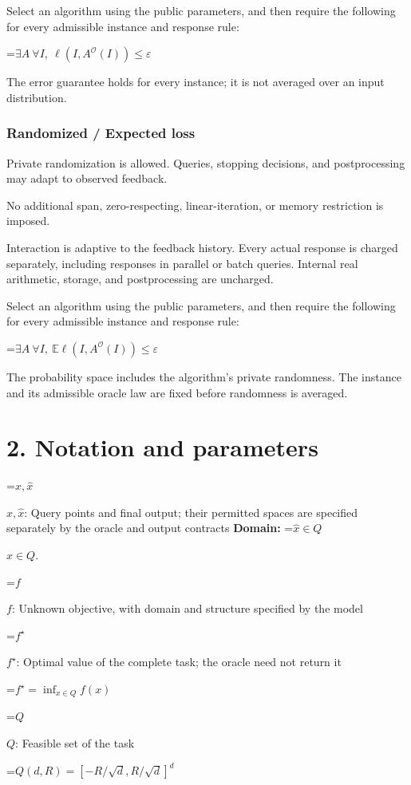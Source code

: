 \documentclass[10pt,a4paper]{article}
\newcommand{\AtlasMath}[1]{\par\begingroup\centering\setbox0=\hbox{$\displaystyle #1$}\ifdim\wd0>1.4\linewidth\typeout{ATLAS WIDE FORMULA: \the\wd0}\fi\ifdim\wd0>\linewidth\resizebox{\linewidth}{!}{\box0}\else\box0\fi\par\endgroup}
\newcommand{\AtlasInlineMath}[1]{\begingroup\setbox0=\hbox{$#1$}\ifdim\wd0>.4\linewidth\endgroup\AtlasMath{#1}\else\endgroup$#1$\fi}
\begin{document}
Select an algorithm using the public parameters, and then require the following for every admissible instance and response rule:


\AtlasMath{\exists A\ \forall I,\ \ell(I,A^\mathcal{O}(I))\le\varepsilon}


The error guarantee holds for every instance; it is not averaged over an input distribution.

\subsubsection{Randomized / Expected loss}
Private randomization is allowed. Queries, stopping decisions, and postprocessing may adapt to observed feedback.

No additional span, zero-respecting, linear-iteration, or memory restriction is imposed.

Interaction is adaptive to the feedback history. Every actual response is charged separately, including responses in parallel or batch queries. Internal real arithmetic, storage, and postprocessing are uncharged.

Select an algorithm using the public parameters, and then require the following for every admissible instance and response rule:


\AtlasMath{\exists A\ \forall I,\ \mathbb{E}\ell(I,A^\mathcal{O}(I))\le\varepsilon}


The probability space includes the algorithm's private randomness. The instance and its admissible oracle law are fixed before randomness is averaged.

\section{2. Notation and parameters}
\AtlasInlineMath{x,\widehat{x}}: Query points and final output; their permitted spaces are specified separately by the oracle and output contracts \textbf{Domain:} \AtlasInlineMath{\widehat{x}\in Q}.

\AtlasInlineMath{f}: Unknown objective, with domain and structure specified by the model

\AtlasInlineMath{f^\star}: Optimal value of the complete task; the oracle need not return it


\AtlasMath{f^\star=\inf_{x\in Q}f(x)}


\AtlasInlineMath{Q}: Feasible set of the task


\AtlasMath{Q(d,R)=[-R/\sqrt d,R/\sqrt d]^d}
\end{document}
